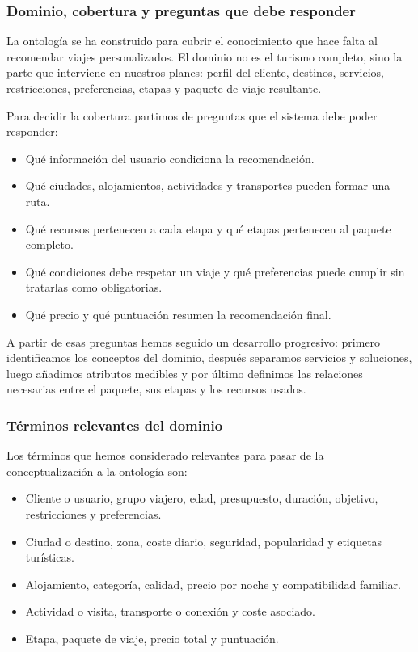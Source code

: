 \documentclass[11pt,a4paper]{article}
\begin{document}
\subsubsection{Dominio, cobertura y preguntas que debe responder}
La ontolog\'ia se ha construido para cubrir el conocimiento que hace falta al
recomendar viajes personalizados. El dominio no es el turismo completo, sino
la parte que interviene en nuestros planes: perfil del cliente, destinos,
servicios, restricciones, preferencias, etapas y paquete de viaje resultante.

Para decidir la cobertura partimos de preguntas que el sistema debe poder
responder:
\begin{itemize}
    \item Qu\'e informaci\'on del usuario condiciona la recomendaci\'on.
    \item Qu\'e ciudades, alojamientos, actividades y transportes pueden formar
    una ruta.
    \item Qu\'e recursos pertenecen a cada etapa y qu\'e etapas pertenecen al
    paquete completo.
    \item Qu\'e condiciones debe respetar un viaje y qu\'e preferencias puede
    cumplir sin tratarlas como obligatorias.
    \item Qu\'e precio y qu\'e puntuaci\'on resumen la recomendaci\'on final.
\end{itemize}

A partir de esas preguntas hemos seguido un desarrollo progresivo: primero
identificamos los conceptos del dominio, despu\'es separamos servicios y
soluciones, luego a\~nadimos atributos medibles y por \'ultimo definimos las
relaciones necesarias entre el paquete, sus etapas y los recursos usados.

\subsubsection{T\'erminos relevantes del dominio}
Los t\'erminos que hemos considerado relevantes para pasar de la
conceptualizaci\'on a la ontolog\'ia son:
\begin{itemize}
    \item Cliente o usuario, grupo viajero, edad, presupuesto, duraci\'on,
    objetivo, restricciones y preferencias.
    \item Ciudad o destino, zona, coste diario, seguridad, popularidad y
    etiquetas tur\'isticas.
    \item Alojamiento, categor\'ia, calidad, precio por noche y compatibilidad
    familiar.
    \item Actividad o visita, transporte o conexi\'on y coste asociado.
    \item Etapa, paquete de viaje, precio total y puntuaci\'on.
\end{itemize}
\end{document}
